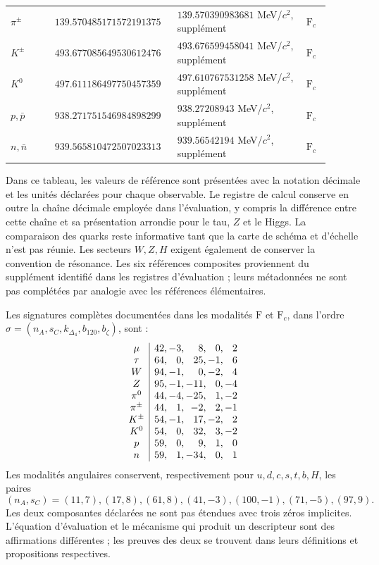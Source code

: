 \begin{longtable}{p{0.13\linewidth}p{0.32\linewidth}p{0.38\linewidth}p{0.07\linewidth}}
\(\pi^\pm\) & \(139.570485171\allowbreak572191375\) & \(139.570390983681\) MeV/\(c^2\), supplément & \(\mathrm F_c\)\\
\(K^\pm\) & \(493.677085649\allowbreak530612476\) & \(493.676599458041\) MeV/\(c^2\), supplément & \(\mathrm F_c\)\\
\(K^0\) & \(497.611186497\allowbreak750457359\) & \(497.610767531258\) MeV/\(c^2\), supplément & \(\mathrm F_c\)\\
\(p,\bar p\) & \(938.271751546\allowbreak984898299\) & \(938.27208943\) MeV/\(c^2\), supplément & \(\mathrm F_c\)\\
\(n,\bar n\) & \(939.565810472\allowbreak507023313\) & \(939.56542194\) MeV/\(c^2\), supplément & \(\mathrm F_c\)\\
\end{longtable}
\endgroup

Dans ce tableau, les valeurs de référence sont présentées avec la notation
décimale et les unités déclarées pour chaque observable. Le registre de
calcul conserve en outre la chaîne décimale employée dans l'évaluation,
y compris la différence entre cette chaîne et sa présentation arrondie pour
le tau, \(Z\) et le Higgs. La comparaison des quarks
reste informative tant que la carte de schéma et d'échelle n'est pas réunie.
Les secteurs \(W,Z,H\) exigent également de conserver la convention de
résonance. Les six références composites proviennent du supplément
identifié dans les registres d'évaluation ; leurs métadonnées ne sont pas complétées
par analogie avec les références élémentaires.

Les signatures complètes documentées dans les modalités \(\mathrm F\) et
\(\mathrm F_c\), dans l'ordre
\(\sigma=(n_A,s_C,k_{\Delta_4},b_{120},b_\zeta)\), sont :
\[
\begin{array}{c|r@{,\,}r@{,\,}r@{,\,}r@{,\,}r}
\mu&42&-3&8&0&2\\
\tau&64&0&25&-1&6\\
W&94&-1&0&-2&4\\
Z&95&-1&-11&0&-4\\
\pi^0&44&-4&-25&1&-2\\
\pi^\pm&44&1&-2&2&-1\\
K^\pm&54&-1&17&-2&2\\
K^0&54&0&32&3&-2\\
p&59&0&9&1&0\\
n&59&1&-34&0&1
\end{array}
\]
Les modalités angulaires conservent, respectivement pour
\(u,d,c,s,t,b,H\), les paires
\[
(n_A,s_C)=(11,7),(17,8),(61,8),(41,-3),(100,-1),(71,-5),(97,9).
\]
Les deux composantes déclarées ne sont pas étendues avec
trois zéros implicites. L’équation d’évaluation et le mécanisme qui
produit un descripteur sont des affirmations différentes ; les preuves des deux
se trouvent dans leurs définitions et propositions respectives.

